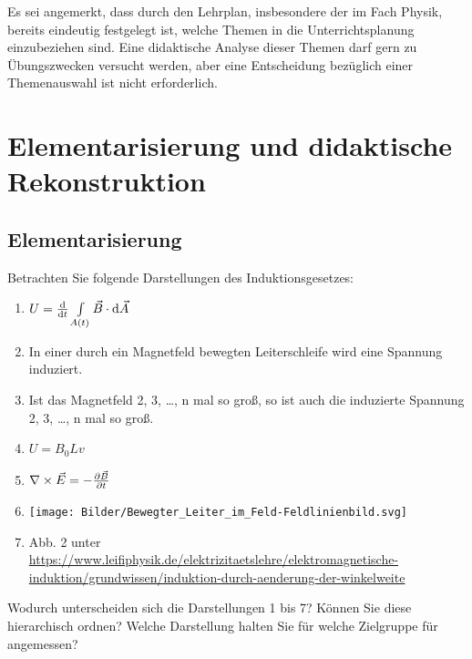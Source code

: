 \bip

Es sei angemerkt, dass durch den Lehrplan, insbesondere der im Fach Physik, bereits eindeutig festgelegt ist, welche Themen in die Unterrichtsplanung einzubeziehen sind. Eine didaktische Analyse dieser Themen darf gern zu \"{U}bungszwecken versucht werden, aber eine Entscheidung bez\"{u}glich einer Themenauswahl ist nicht erforderlich.

\bip\bip
\section{Elementarisierung und didaktische Rekonstruktion}


\subsection{Elementarisierung}\label{Elementarisierung}

\begin{uea}
	Betrachten Sie folgende Darstellungen des Induktionsgesetzes:
	\begin{enumerate}
		\item $U = \dv{t} \int\limits_{A(t)} \vec{B}\cdot \dd{\vec{A}}$
		\item In einer durch ein Magnetfeld bewegten Leiterschleife wird eine Spannung induziert.
		\item Ist das Magnetfeld 2, 3, \dots, n mal so groß, so ist auch die induzierte Spannung 2, 3, \dots, n mal so groß.
		\item $U=B_0 L v$
		\item $\nabla\times\vec{E} = - \pdv{\vec{B}}{t}$
		\item \texttt{[image: Bilder/Bewegter\_Leiter\_im\_Feld-Feldlinienbild.svg]}
		\item Abb. 2 unter \url{https://www.leifiphysik.de/elektrizitaetslehre/elektromagnetische-induktion/grundwissen/induktion-durch-aenderung-der-winkelweite}
	\end{enumerate}
	Wodurch unterscheiden sich die Darstellungen 1 bis 7? Können Sie diese hierarchisch ordnen? Welche Darstellung halten Sie für welche Zielgruppe für angemessen?
\end{uea}

